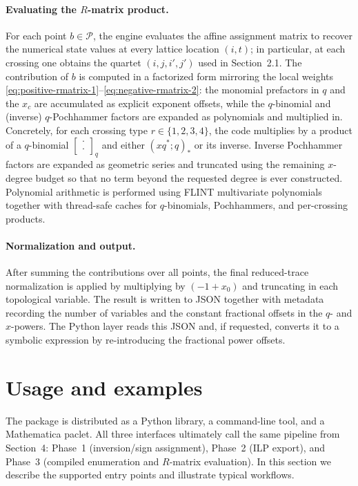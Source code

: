 \documentclass[twocolumn]{article}
\begin{document}
\paragraph{Evaluating the $R$-matrix product.}
For each point \(b\in\mathcal P\), the engine evaluates the affine assignment
matrix to recover the numerical state values at every lattice location
\((i,t)\); in particular, at each crossing one obtains the quartet
\((i,j,i',j')\) used in Section~2.1.
The contribution of \(b\) is computed in a factorized form mirroring the local
weights \eqref{eq:positive-rmatrix-1}--\eqref{eq:negative-rmatrix-2}:
the monomial prefactors in \(q\) and the \(x_c\) are accumulated as explicit
exponent offsets, while the $q$-binomial and (inverse) $q$-Pochhammer factors are
expanded as polynomials and multiplied in.
Concretely, for each crossing type \(r\in\{1,2,3,4\}\), the code multiplies by a
product of a $q$-binomial
\(\begin{bmatrix}\cdot\\\cdot\end{bmatrix}_q\) and either \((xq^{\ast};q)_{\ast}\) or its inverse.
Inverse Pochhammer factors are expanded as geometric series and truncated using
the remaining $x$-degree budget so that no term beyond the requested degree is
ever constructed.
Polynomial arithmetic is performed using FLINT multivariate polynomials
together with thread-safe caches for $q$-binomials,
Pochhammers, and per-crossing products.

\paragraph{Normalization and output.}
After summing the contributions over all points, the final reduced-trace
normalization is applied by multiplying by \((-1+x_0)\) and truncating in each topological variable.
The result is written to JSON together with metadata recording the number of
variables and the constant fractional offsets in the \(q\)- and \(x\)-powers.
The Python layer reads this JSON and, if requested, converts it to a symbolic
expression by re-introducing the fractional power offsets.

\section{Usage and examples}

The package is distributed as a Python library, a command-line tool, and a
Mathematica paclet.  All three interfaces ultimately call the same pipeline
from Section~4: Phase~1 (inversion/sign assignment), Phase~2 (ILP export), and
Phase~3 (compiled enumeration and $R$-matrix evaluation).  In this section we
describe the supported entry points and illustrate typical workflows.
\end{document}
